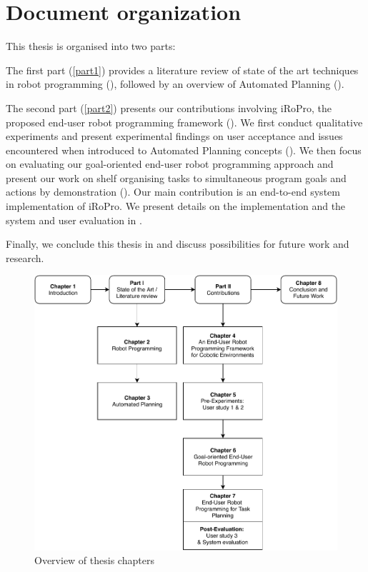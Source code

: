 \section{Document organization}
This thesis is organised into two parts:

The first part (\ref{part1}) provides a literature review of state of the art techniques in robot programming ({}), followed by an overview of Automated Planning ({}).

The second part (\ref{part2}) presents our contributions involving iRoPro, the proposed end-user robot programming framework ({}). 
We first conduct qualitative experiments and present experimental findings on user acceptance and issues encountered when introduced to Automated Planning concepts ({}).
We then focus on evaluating our goal-oriented end-user robot programming approach and present our work on shelf organising tasks to simultaneous program goals and actions by demonstration ({}).
Our main contribution is an end-to-end system implementation of iRoPro. We present details on the implementation and the system and user evaluation in {}.

Finally, we conclude this thesis in {} and discuss possibilities for future work and research.

%


\begin{figure}[h]
	\includegraphics[width=\linewidth]{figures/chapter-overview.pdf}
	\caption{Overview of thesis chapters}
	\label{fig:chapter-overview}
\end{figure}
